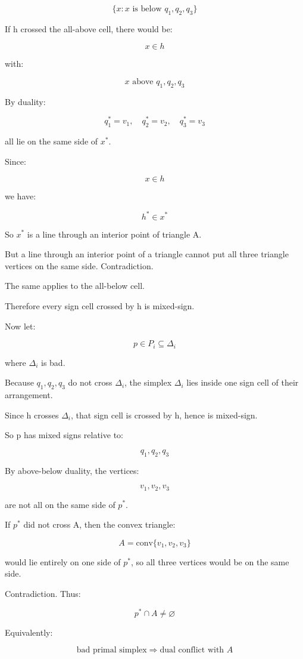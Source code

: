 \documentclass[
  11pt,
]{article}
\begin{document}
\[
\lbrace x:x\text{ is below }q_1,q_2,q_3 \rbrace
\]

If h crossed the all-above cell, there would be:

\[
x\in h
\]

with:

\[
x\text{ above }q_1,q_2,q_3
\]

By duality:

\[
q_1^\ast =v_1,\quad q_2^\ast =v_2,\quad q_3^\ast =v_3
\]

all lie on the same side of \(x^*\).

Since:

\[
x\in h
\]

we have:

\[
h^\ast \in x^\ast 
\]

So \(x^*\) is a line through an interior point of triangle A.

But a line through an interior point of a triangle cannot put all three
triangle vertices on the same side. Contradiction.

The same applies to the all-below cell.

Therefore every sign cell crossed by h is mixed-sign.

Now let:

\[
p\in P_i\subseteq\Delta_i
\]

where \(\Delta_i\) is bad.

Because \(q_1,q_2,q_3\) do not cross \(\Delta_i\), the simplex
\(\Delta_i\) lies inside one sign cell of their arrangement.

Since h crosses \(\Delta_i\), that sign cell is crossed by h, hence is
mixed-sign.

So p has mixed signs relative to:

\[
q_1,q_2,q_3
\]

By above-below duality, the vertices:

\[
v_1,v_2,v_3
\]

are not all on the same side of \(p^*\).

If \(p^*\) did not cross A, then the convex triangle:

\[
A=\mathrm{conv}\lbrace v_1,v_2,v_3 \rbrace
\]

would lie entirely on one side of \(p^*\), so all three vertices would
be on the same side.

Contradiction. Thus:

\[
p^\ast \cap A\ne\varnothing
\]

Equivalently:

\[
\text{bad primal simplex} \Longrightarrow \text{dual conflict with }A
\]
\end{document}
